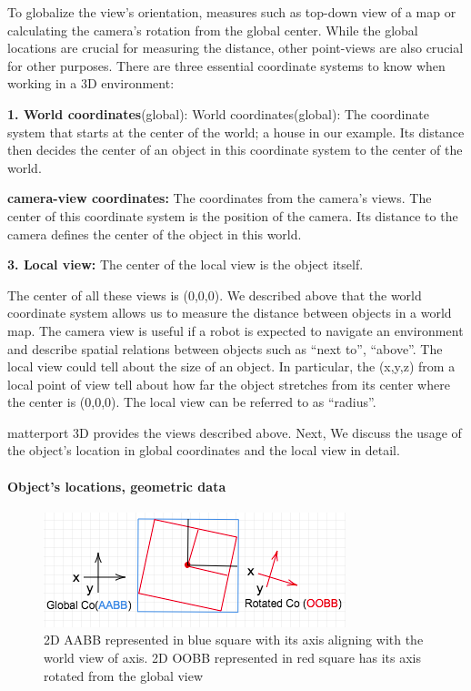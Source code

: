 To globalize the view's orientation, measures such as top-down view of a map or calculating the camera's rotation from the global center. While the global locations are crucial for measuring the distance, other point-views are also crucial for other purposes. There are three essential coordinate systems to know when working in a 3D environment: 

\textbf{1. World coordinates}(global):  World coordinates(global): The coordinate system that starts at the center of the world; a house in our example. Its distance then decides the center of an object in this coordinate system to the center of the world. 

\textbf{camera-view coordinates:} The coordinates from the camera’s views. The center of this coordinate system is the position of the camera. Its distance to the camera defines the center of the object in this world. 

\textbf{3. Local view:} The center of the local view is the object itself. 

The center of all these views is (0,0,0). We described above that the world coordinate system allows us to measure the distance between objects in a world map. The camera view is useful if a robot is expected to navigate an environment and describe spatial relations between objects such as “next to”, “above”. The local view could tell about the size of an object. In particular, the (x,y,z) from a local point of view tell about how far the object stretches from its center where the center is (0,0,0). The local view can be referred to as “radius”. 

matterport 3D provides the views described above. Next, We discuss the usage of the object’s location in global coordinates and the local view in detail. 

\paragraph{Object's locations, geometric data}

\begin{figure}[H]
\centering
\includegraphics[scale=0.5]{images/A-OB.png}
\caption{2D AABB represented in blue square with its axis aligning with the world view of axis. 2D OOBB represented in red square has its axis rotated from the global view }
\label{fig:A-OB}
\end{figure}

